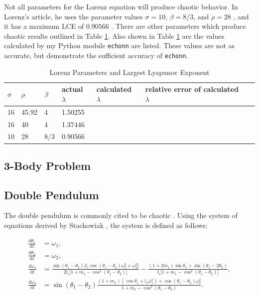 \documentclass{article}
\newcommand{\der}[2][t]{\frac{\mathrm{d}#2}{\mathrm{d}#1}}
\begin{document}
Not all parameters for the Lorenz equation will produce chaotic behavior. In 
Lorenz's article, he uses the parameter values $\sigma=10$, $\beta=8/3$, and
$\rho=28$ \cite{lorenz1963deterministic}, and it has a maximum LCE of $0.90566$ 
\cite{viswanath1998lyapunov}. There are other parameters which
produce chaotic results outlined in Table \ref{table:lorenz_params}. Also shown 
in Table \ref{table:lorenz_params} are the values calculated by my Python
module \texttt{echonn} are listed. These values are not as accurate, but 
demonstrate the sufficient accuracy of \texttt{echonn}.

\begin{table}[H]
    \centering
    \begin{tabular}{|l|l|l|l|l|l|l|}
        \hline
        $\sigma$ & $\rho$ & $\beta$ & actual $\lambda$ & calculated $\lambda$ & relative error of calculated $\lambda$ \\
        \hline \hline
        16 & 45.92 & 4 & 1.50255 & & \\
        16 & 40 & 4 & 1.37446 & & \\
        10 & 28 & 8/3 & 0.90566 & & \\
        \hline
    \end{tabular}
    \caption{
        Lorenz Parameters and Largest Lyapunov Exponent
        \cite{viswanath1998lyapunov}
    }
    \label{table:lorenz_params}
\end{table}

\subsection{3-Body Problem}

\subsection{Double Pendulum}

The double pendulum is commonly cited to be chaotic 
\cite{stachowiak2006numerical} \cite{levien1993double}. Using the system 
of equations derived by Stachowiak \cite{stachowiak2006numerical}, the system is
defined as follows:

\begin{align}
    \der{\theta_1} &= \omega_1, \nonumber \\
    \der{\theta_2} &= \omega_2, \nonumber \\
    \der{\omega_1} &= 
    \frac{
        \sin(\theta_1 - \theta_2) \lbrack
            l_1 \cos(\theta_1 - \theta_2) \omega_1^2 + \omega_2^2
        \rbrack
    }{
        2 l_1 \lbrack
            1 + m_1 - \cos^2(\theta_1 - \theta_2)
        \rbrack
    }
    -
    \frac{
        (1 + 2 m_1) \sin \theta_1 + \sin(\theta_1 - 2 \theta_2)
    }{
        l_1 \lbrack
            1 + m_1 - \cos^2(\theta_1 - \theta_2)
        \rbrack
    }
    , \nonumber \\
    \der{\omega_2} &= \sin (\theta_1 - \theta_2) 
    \frac{
        (1+m_1) (\cos \theta_1 + l_1 \omega_1^2)
        +
        \cos(\theta_1 - \theta_2) \omega_2^2
    }{
        1 + m_1 - \cos^2(\theta_1 - \theta_2)
    }. \label{eq:doub_pen}
\end{align}
\end{document}
